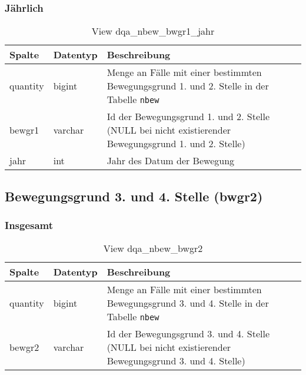 
\subsubsection{Jährlich} \label{subsubsec:bewg1J}

\begin{table}[ht]
	\centering   
	\caption{View dqa\_nbew\_bwgr1\_jahr}
	\label{tab:bewG1J}
	\begin{tabular}{||l|l|p{10cm}||}   		
		\hline
		Spalte & Datentyp & Beschreibung \\ [0.5ex]
		\hline\hline
		quantity & bigint & Menge an Fälle mit einer bestimmten Bewegungsgrund 1. und 2. Stelle in der Tabelle \texttt{nbew}\\
		\hline
		bewgr1 & varchar & Id der Bewegungsgrund 1. und 2. Stelle (NULL bei nicht existierender Bewegungsgrund 1. und 2. Stelle)\\
		\hline
		jahr & int &  Jahr des Datum der Bewegung \\
		\hline		
	\end{tabular}
\end{table}

\subsection{Bewegungsgrund 3. und 4. Stelle (bwgr2)} \label{subsec:bewgr2}

\subsubsection{Insgesamt} \label{subsubsec:bewg2I}

\begin{table}[ht]
	\centering   
	\caption{View dqa\_nbew\_bwgr2}
	\label{tab:bewG2I}
	\begin{tabular}{||l|l|p{10cm}||}   		
		\hline
		Spalte & Datentyp & Beschreibung \\ [0.5ex]
		\hline\hline
		quantity & bigint & Menge an Fälle mit einer bestimmten Bewegungsgrund 3. und 4. Stelle in der Tabelle \texttt{nbew} \\
		\hline
		bewgr2 & varchar & Id der Bewegungsgrund 3. und 4. Stelle (NULL bei nicht existierender Bewegungsgrund 3. und 4. Stelle)\\
		\hline
		
	\end{tabular}
\end{table}

\newpage

